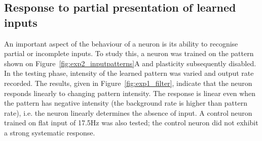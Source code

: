 \documentclass[a4paper,12pt]{report}
\theoremstyle{definition}
\begin{document}
\begin{figure}[!htb]
\begin{minipage}[t]{.5\textwidth}
  \captionsetup{width=0.95\linewidth}
  \label{fig:exp5_patterncompletion}
\end{minipage}
\end{figure}







\subsection{Response to partial presentation of learned inputs}
\label{subsec:partialpatterns}


An important aspect of the behaviour of a neuron is its ability to recognise partial or incomplete inputs. To study this, a neuron was trained on the pattern shown on Figure~\ref{fig:exp2_inputpatterns}A and plasticity subsequently disabled. In the testing phase, intensity of the learned pattern was varied and output rate recorded. The results, given in Figure~\ref{fig:exp1_filter}, indicate that the neuron responds linearly to changing pattern intensity. The response is linear even when the pattern has negative intensity (the background rate is higher than pattern rate), i.e. the neuron linearly determines the absence of input. A control neuron trained on flat input of 17.5Hz was also tested; the control neuron did not exhibit a strong systematic response.


\end{document}
